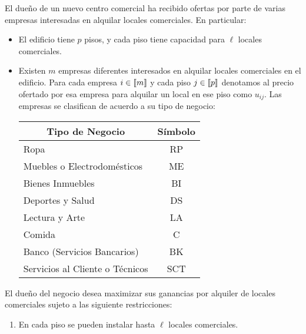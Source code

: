 \documentclass[ a4paper, twoside, 11pt]{article}
\begin{document}
\begin{problem}

El due\~no de un nuevo centro comercial ha recibido ofertas por parte de varias empresas interesadas en alquilar locales comerciales. En particular: 
\begin{itemize}
\item El edificio tiene $p$ pisos, y cada piso tiene capacidad para $\ell$ locales comerciales. 
\item Existen $m$ empresas diferentes interesados en alquilar locales comerciales en el edificio. Para cada empresa $i \in \llbracket m \rrbracket$ y cada piso $j \in \llbracket p \rrbracket$ denotamos al precio ofertado por esa empresa para alquilar un local en ese piso como $u_{ij}$. Las empresas se clasifican de acuerdo a su tipo de negocio: 

\begin{table}[htb]
\centering
\begin{tabular}{|l|c|}
\hline
\multicolumn{1}{|c|}{\textbf{Tipo de Negocio}} & \textbf{S\'imbolo} \\ \hline
Ropa                                           & RP                 \\ \hline
Muebles o Electrodom\'esticos                  & ME                 \\ \hline
Bienes Inmuebles                               & BI                 \\ \hline
Deportes y Salud                               & DS                 \\ \hline
Lectura y Arte                                 & LA                 \\ \hline
Comida                                         & C                  \\ \hline
Banco (Servicios Bancarios)                    & BK                 \\ \hline
Servicios al Cliente o T\'ecnicos              & SCT                \\ \hline
\end{tabular}
\end{table}

\end{itemize}

El due\~no del negocio desea maximizar sus ganancias por alquiler de locales comerciales sujeto a las siguiente restricciones: 
\begin{enumerate}[label=\textbf{\alph*)}]
\item En cada piso se pueden instalar hasta $\ell$ locales comerciales. 


\end{enumerate}
\end{problem}
\end{document}
